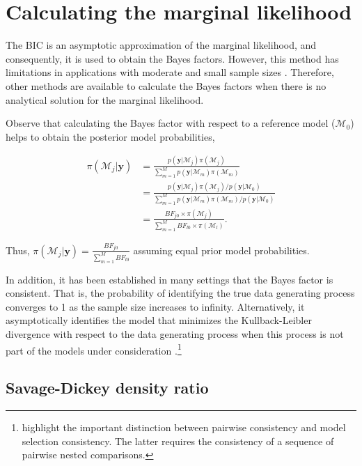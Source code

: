 \section{Calculating the marginal likelihood}\label{sec10_4}

The BIC is an asymptotic approximation of the marginal likelihood, and consequently, it is used to obtain the Bayes factors. However, this method has limitations in applications with moderate and small sample sizes \cite{gelfand1994bayesian}. Therefore, other methods are available to calculate the Bayes factors when there is no analytical solution for the marginal likelihood.

Observe that calculating the Bayes factor with respect to a reference model ($\mathcal{M}_0$) helps to obtain the posterior model probabilities,

\begin{align*}
	\pi(\mathcal{M}_j |\bm{y})&=\frac{p(\bm{y} | \mathcal{M}_j)\pi(\mathcal{M}_j)}{\sum_{m=1}^{M}p(\bm{y} | \mathcal{M}_m)\pi(\mathcal{M}_m)}\\
	&=\frac{p(\bm{y} | \mathcal{M}_j)\pi(\mathcal{M}_j)/p(\bm{y} | \mathcal{M}_0)}{\sum_{m=1}^{M}p(\bm{y} | \mathcal{M}_m)\pi(\mathcal{M}_m)/p(\bm{y} | \mathcal{M}_0)}\\
	&=\frac{BF_{j0}\times\pi(\mathcal{M}_j)}{\sum_{m=1}^{M}BF_{l0}\times\pi(\mathcal{M}_l)}.
\end{align*}

Thus, $\pi(\mathcal{M}_j |\bm{y})=\frac{BF_{j0}}{\sum_{m=1}^{M}BF_{l0}}$ assuming equal prior model probabilities.

In addition, it has been established in many settings that the Bayes factor is consistent. That is, the probability of identifying the true data generating process converges to 1 as the sample size increases to infinity. Alternatively, it asymptotically identifies the model that minimizes the Kullback-Leibler divergence with respect to the data generating process when this process is not part of the models under consideration \cite{chib2016bayes, walker2004new, walker2004modern}.\footnote{\cite{Johnson2012} highlight the important distinction between pairwise consistency and model selection consistency. The latter requires the consistency of a sequence of pairwise nested comparisons.}

\subsection{Savage-Dickey density ratio}\label{sec10_4_1}


